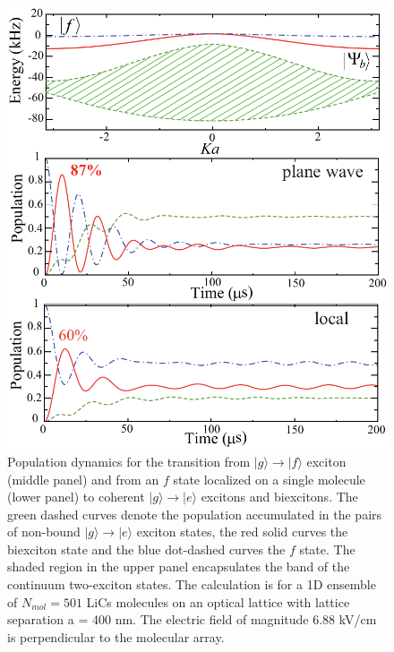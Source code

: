 \begin{figure}[htbp]
\centering
\includegraphics[scale=0.8]{Figure4.pdf}
\caption{Population dynamics for the transition from $|g\rangle \to |f\rangle$ exciton (middle panel) and from an $f$
 state localized on a single molecule (lower panel) to coherent $|g\rangle \to |e\rangle$ excitons and biexcitons. The
 green dashed curves denote the population accumulated in the pairs of non-bound $|g\rangle \to |e\rangle$ exciton
 states, the red solid curves the biexciton state and the blue dot-dashed curves the $f$ state. The shaded region in the
 upper panel encapsulates the band of the continuum two-exciton states. The calculation is for a 1D ensemble of
 $N_{mol}=501$ LiCs molecules on an optical lattice with lattice separation a = 400 nm. The electric field of magnitude
 6.88 kV/cm is perpendicular to the molecular array.}
\label{fig:populationDynamics}
\end{figure}

